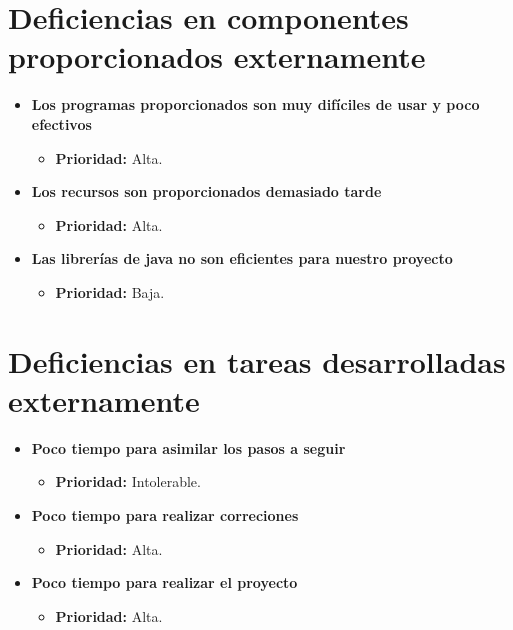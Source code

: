 \documentclass[spanish,a4paper,12pt]{report}	%
\begin{document}
\section{Deficiencias en componentes proporcionados externamente}
	\begin{itemize}
		
		\item \textbf{Los programas proporcionados son muy difíciles de usar y poco efectivos}	
			\begin{itemize}
				\item \textbf{Prioridad: }Alta.
			\end{itemize}
		
		\item \textbf{Los recursos son proporcionados demasiado tarde}	%
			\begin{itemize}
				\item \textbf{Prioridad: }Alta.
			\end{itemize}

		\item \textbf{Las librerías de java no son eficientes para nuestro proyecto}	
			\begin{itemize}
				\item \textbf{Prioridad: }Baja.
			\end{itemize}
	\end{itemize}
%
\section{Deficiencias en tareas desarrolladas externamente}
	\begin{itemize}
		\item \textbf{Poco tiempo para asimilar los pasos a seguir}	
			\begin{itemize}
				\item \textbf{Prioridad: }Intolerable.
			\end{itemize}

		\item \textbf{Poco tiempo para realizar correciones}	%
			\begin{itemize}
				\item \textbf{Prioridad: }Alta.
			\end{itemize}

\item \textbf{Poco tiempo para realizar el proyecto}
			\begin{itemize}
				\item \textbf{Prioridad: }Alta.
			\end{itemize}
		
	\end{itemize}
%
\end{document}

